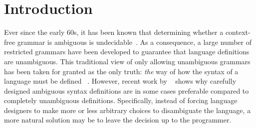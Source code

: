 \documentclass[acmsmall,review,anonymous]{acmart}\settopmatter{printfolios=true,printccs=false,printacmref=false}
\begin{document}


\maketitle


\section{Introduction}

Ever since the early 60s, it has been known that determining whether a context-free
grammar is ambiguous is undecidable~\cite{cantorAmbiguityProblemBackus1962}. As a consequence,
a large number of restricted grammars have been developed to guarantee
that language definitions are unambiguous. This traditional view of
only allowing unambiguous grammars has been taken for granted as the
only truth: \emph{the} way of how the syntax of a language must be
defined ~\cite{sudkampLanguagesMachinesIntroduction1997,ahoCompilersPrinciplesTechniques2006,webberModernProgrammingLanguages2003,cooperEngineeringCompiler2011,ginsburgAmbiguityContextFree1966}.
%
However, recent work by
~\citet{palmkvistCreatingDomainSpecificLanguages2019} shows why
carefully designed ambiguous syntax definitions are in some cases
preferable compared to completely unambiguous
definitions. Specifically, instead of forcing language designers to
make more or less arbitrary choices to disambiguate the language, a more natural
solution may be to leave the decision up to the programmer.
\end{document}

